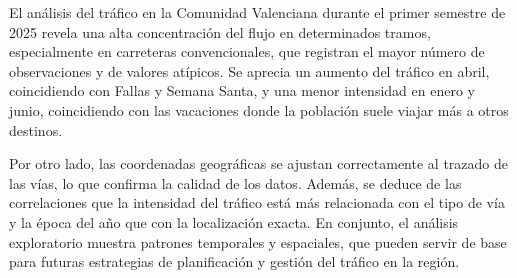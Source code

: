 \documentclass[notspecified,article,submit,moreauthors,pdftex]{Definitions/mdpi}
\begin{document}
El análisis del tráfico en la Comunidad Valenciana durante el primer
semestre de 2025 revela una alta concentración del flujo en determinados
tramos, especialmente en carreteras convencionales, que registran el
mayor número de observaciones y de valores atípicos. Se aprecia un
aumento del tráfico en abril, coincidiendo con Fallas y Semana Santa, y
una menor intensidad en enero y junio, coincidiendo con las vacaciones
donde la población suele viajar más a otros destinos.

Por otro lado, las coordenadas geográficas se ajustan correctamente al
trazado de las vías, lo que confirma la calidad de los datos. Además, se
deduce de las correlaciones que la intensidad del tráfico está más
relacionada con el tipo de vía y la época del año que con la
localización exacta. En conjunto, el análisis exploratorio muestra
patrones temporales y espaciales, que pueden servir de base para futuras
estrategias de planificación y gestión del tráfico en la región.


\vspace{6pt}



\end{document}
